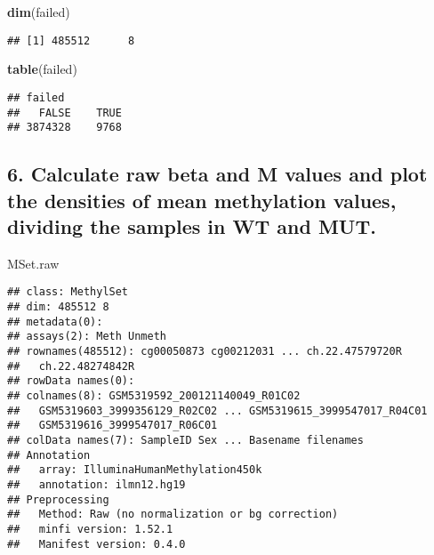 \documentclass[
]{article}
\newenvironment{Shaded}{\begin{snugshade}}{\end{snugshade}}
\newcommand{\FunctionTok}[1]{\textcolor[rgb]{0.13,0.29,0.53}{\textbf{#1}}}
\newcommand{\NormalTok}[1]{#1}
\begin{document}
\begin{Shaded}
\begin{Highlighting}[]
\FunctionTok{dim}\NormalTok{(failed)}
\end{Highlighting}
\end{Shaded}

\begin{verbatim}
## [1] 485512      8
\end{verbatim}

\begin{Shaded}
\begin{Highlighting}[]
\FunctionTok{table}\NormalTok{(failed)}
\end{Highlighting}
\end{Shaded}

\begin{verbatim}
## failed
##   FALSE    TRUE 
## 3874328    9768
\end{verbatim}

\subsection{6. Calculate raw beta and M values and plot the densities of
mean methylation values, dividing the samples in WT and
MUT.}\label{calculate-raw-beta-and-m-values-and-plot-the-densities-of-mean-methylation-values-dividing-the-samples-in-wt-and-mut.}

\begin{Shaded}
\begin{Highlighting}[]
\NormalTok{MSet.raw}
\end{Highlighting}
\end{Shaded}

\begin{verbatim}
## class: MethylSet 
## dim: 485512 8 
## metadata(0):
## assays(2): Meth Unmeth
## rownames(485512): cg00050873 cg00212031 ... ch.22.47579720R
##   ch.22.48274842R
## rowData names(0):
## colnames(8): GSM5319592_200121140049_R01C02
##   GSM5319603_3999356129_R02C02 ... GSM5319615_3999547017_R04C01
##   GSM5319616_3999547017_R06C01
## colData names(7): SampleID Sex ... Basename filenames
## Annotation
##   array: IlluminaHumanMethylation450k
##   annotation: ilmn12.hg19
## Preprocessing
##   Method: Raw (no normalization or bg correction)
##   minfi version: 1.52.1
##   Manifest version: 0.4.0
\end{verbatim}
\end{document}
